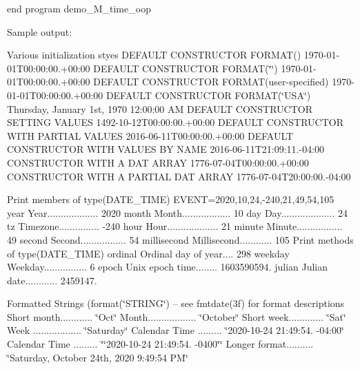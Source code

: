 end program demo\+\_\+\+M\+\_\+time\+\_\+oop

Sample output\+:

Various initialization styes D\+E\+F\+A\+U\+LT C\+O\+N\+S\+T\+R\+U\+C\+T\+OR F\+O\+R\+M\+AT() 1970-\/01-\/01\+T00\+:00\+:00.+00\+:00 D\+E\+F\+A\+U\+LT C\+O\+N\+S\+T\+R\+U\+C\+T\+OR F\+O\+R\+M\+AT(\char`\"{}\char`\"{}) 1970-\/01-\/01\+T00\+:00\+:00.+00\+:00 D\+E\+F\+A\+U\+LT C\+O\+N\+S\+T\+R\+U\+C\+T\+OR F\+O\+R\+M\+AT(user-\/specified) 1970-\/01-\/01\+T00\+:00\+:00.+00\+:00 D\+E\+F\+A\+U\+LT C\+O\+N\+S\+T\+R\+U\+C\+T\+OR F\+O\+R\+M\+AT(\char`\"{}\+U\+S\+A\char`\"{}) Thursday, January 1st, 1970 12\+:00\+:00 AM D\+E\+F\+A\+U\+LT C\+O\+N\+S\+T\+R\+U\+C\+T\+OR S\+E\+T\+T\+I\+NG V\+A\+L\+U\+ES 1492-\/10-\/12\+T00\+:00\+:00.+00\+:00 D\+E\+F\+A\+U\+LT C\+O\+N\+S\+T\+R\+U\+C\+T\+OR W\+I\+TH P\+A\+R\+T\+I\+AL V\+A\+L\+U\+ES 2016-\/06-\/11\+T00\+:00\+:00.+00\+:00 D\+E\+F\+A\+U\+LT C\+O\+N\+S\+T\+R\+U\+C\+T\+OR W\+I\+TH V\+A\+L\+U\+ES BY N\+A\+ME 2016-\/06-\/11\+T21\+:09\+:11.-\/04\+:00 C\+O\+N\+S\+T\+R\+U\+C\+T\+OR W\+I\+TH A D\+AT A\+R\+R\+AY 1776-\/07-\/04\+T00\+:00\+:00.+00\+:00 C\+O\+N\+S\+T\+R\+U\+C\+T\+OR W\+I\+TH A P\+A\+R\+T\+I\+AL D\+AT A\+R\+R\+AY 1776-\/07-\/04\+T20\+:00\+:00.-\/04\+:00

Print members of type(\+D\+A\+T\+E\+\_\+\+T\+I\+M\+E) E\+V\+E\+NT=2020,10,24,-\/240,21,49,54,105 year Year................... 2020 month Month.................. 10 day Day.................... 24 tz Timezone............... -\/240 hour Hour................... 21 minute Minute................. 49 second Second................. 54 millisecond Millisecond............ 105 Print methods of type(\+D\+A\+T\+E\+\_\+\+T\+I\+M\+E) ordinal Ordinal day of year.... 298 weekday Weekday................ 6 epoch Unix epoch time........ 1603590594. julian Julian date............ 2459147.

Formatted Strings (format(\char`\"{}\+S\+T\+R\+I\+N\+G\char`\"{}) -- see fmtdate(3f) for format descriptions Short month............ \char`\"{}\+Oct\char`\"{} Month.................. \char`\"{}\+October\char`\"{} Short week............. \char`\"{}\+Sat\char`\"{} Week .................. \char`\"{}\+Saturday\char`\"{} Calendar Time ......... \char`\"{}2020-\/10-\/24 21\+:49\+:54. -\/04\+:00\char`\"{} Calendar Time ......... \char`\"{}\char`\"{}2020-\/10-\/24 21\+:49\+:54. -\/0400\char`\"{}\char`\"{} Longer format.......... \char`\"{}\+Saturday, October 24th, 2020 9\+:49\+:54 P\+M\char`\"{}

